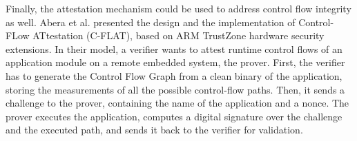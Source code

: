 Finally, the attestation mechanism could be used to address control flow integrity as well.
Abera et al. \cite{cflat} presented the design and the implementation of Control-FLow ATtestation (C-FLAT), based on ARM TrustZone hardware security extensions.
In their model, a verifier wants to attest runtime control flows of an application module on a remote embedded system, the prover.
First, the verifier has to generate the Control Flow Graph from a clean binary of the application, storing the measurements of all the possible control-flow paths.
Then, it sends a challenge to the prover, containing the name of the application and a nonce. The prover executes the application, computes a digital signature
over the challenge and the executed path, and sends it back to the verifier for validation.
